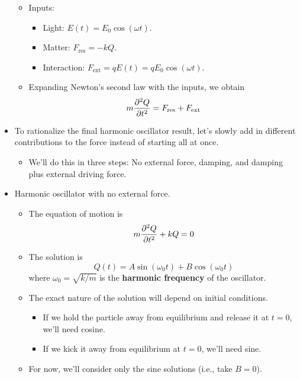 \documentclass[../notes.tex]{subfiles}
\begin{document}
\begin{itemize}
\begin{itemize}
        \item Inputs:
        \begin{itemize}
            \item Light: $E(t)=E_0\cos(\omega t)$.
            \item Matter: $F_\text{res}=-kQ$.
            \item Interaction: $F_\text{ext}=qE(t)=qE_0\cos(\omega t)$.
        \end{itemize}
        \item Expanding Newton's second law with the inputs, we obtain
        \begin{align*}
            m\pdv[2]{Q}{t} = F_\text{res}+F_\text{ext}
        \end{align*}
    \end{itemize}
    \item To rationalize the final harmonic oscillator result, let's slowly add in different contributions to the force instead of starting all at once.
    \begin{itemize}
        \item We'll do this in three steps: No external force, damping, and damping plus external driving force.
    \end{itemize}
    \item Harmonic oscillator with no external force.
    \begin{itemize}
        \item The equation of motion is
        \begin{equation*}
            m\pdv[2]{Q}{t}+kQ = 0
        \end{equation*}
        \item The solution is
        \begin{equation*}
            Q(t) = A\sin(\omega_0t)+B\cos(\omega_0t)
        \end{equation*}
        where $\omega_0=\sqrt{k/m}$ is the \textbf{harmonic frequency} of the oscillator.
        \item The exact nature of the solution will depend on initial conditions.
        \begin{itemize}
            \item If we hold the particle away from equilibrium and release it at $t=0$, we'll need cosine.
            \item If we kick it away from equilibrium at $t=0$, we'll need sine.
        \end{itemize}
        \item For now, we'll consider only the sine solutions (i.e., take $B=0$).

\end{itemize}
\end{itemize}
\end{document}
